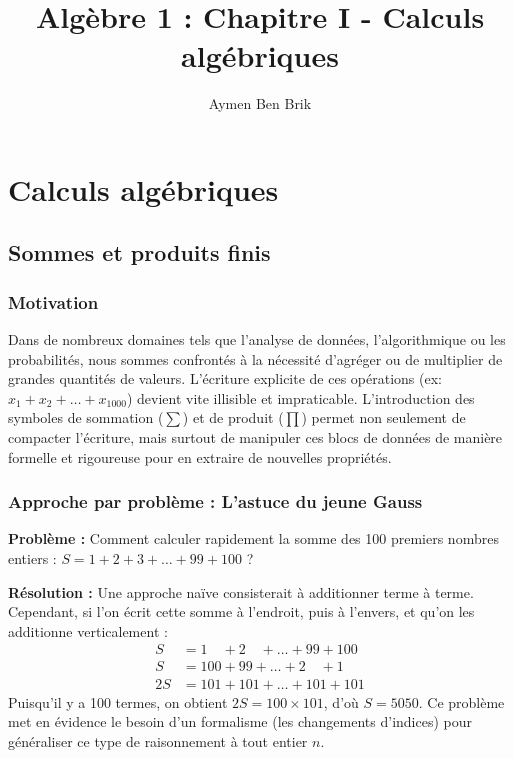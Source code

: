 \documentclass[12pt,a4paper]{report}
\title{Algèbre 1 : Chapitre I - Calculs algébriques}
\author{Aymen Ben Brik}
\date{}
\begin{document}
\maketitle

\chapter{Calculs algébriques}

\section{Sommes et produits finis}

\subsection{Motivation}
Dans de nombreux domaines tels que l'analyse de données, l'algorithmique ou les probabilités, nous sommes confrontés à la nécessité d'agréger ou de multiplier de grandes quantités de valeurs. L'écriture explicite de ces opérations (ex: $x_1 + x_2 + \dots + x_{1000}$) devient vite illisible et impraticable. L'introduction des symboles de sommation ($\sum$) et de produit ($\prod$) permet non seulement de compacter l'écriture, mais surtout de manipuler ces blocs de données de manière formelle et rigoureuse pour en extraire de nouvelles propriétés.

\subsection{Approche par problème : L'astuce du jeune Gauss}
\textbf{Problème :} Comment calculer rapidement la somme des 100 premiers nombres entiers : $S = 1 + 2 + 3 + \dots + 99 + 100$ ?

\textbf{Résolution :} Une approche naïve consisterait à additionner terme à terme. Cependant, si l'on écrit cette somme à l'endroit, puis à l'envers, et qu'on les additionne verticalement :
\begin{align*}
S &= 1 \quad + 2 \quad + \dots + 99 + 100 \\
S &= 100 + 99 + \dots + 2 \quad + 1 \\
\hline
2S &= 101 + 101 + \dots + 101 + 101
\end{align*}
Puisqu'il y a 100 termes, on obtient $2S = 100 \times 101$, d'où $S = 5050$. 
Ce problème met en évidence le besoin d'un formalisme (les changements d'indices) pour généraliser ce type de raisonnement à tout entier $n$.
\end{document}

